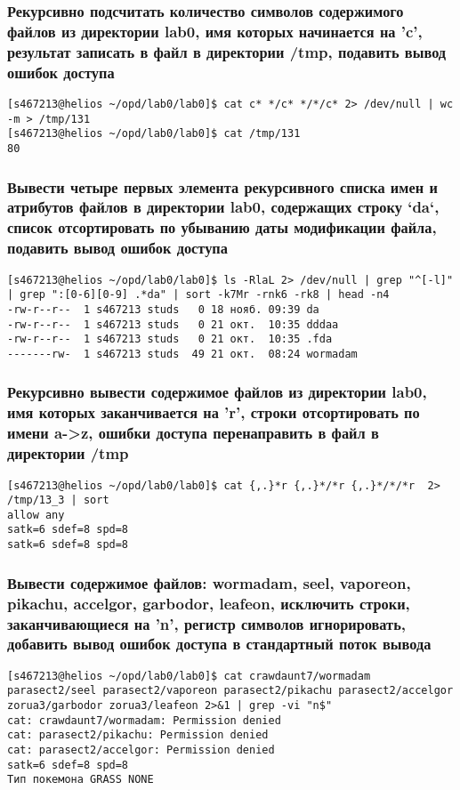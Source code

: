\subsubsection*{Рекурсивно подсчитать количество символов содержимого файлов из директории lab0, имя которых начинается на 'c', результат записать в файл в директории /tmp, подавить вывод ошибок доступа}
\begin{verbatim}
[s467213@helios ~/opd/lab0/lab0]$ cat c* */c* */*/c* 2> /dev/null | wc -m > /tmp/131
[s467213@helios ~/opd/lab0/lab0]$ cat /tmp/131
80
\end{verbatim}


\subsubsection*{Вывести четыре первых элемента рекурсивного списка имен и атрибутов файлов в директории lab0, содержащих строку `da`, список отсортировать по убыванию даты модификации файла, подавить вывод ошибок доступа}
\begin{verbatim}
[s467213@helios ~/opd/lab0/lab0]$ ls -RlaL 2> /dev/null | grep "^[-l]" | grep ":[0-6][0-9] .*da" | sort -k7Mr -rnk6 -rk8 | head -n4
-rw-r--r--  1 s467213 studs   0 18 нояб. 09:39 da
-rw-r--r--  1 s467213 studs   0 21 окт.  10:35 dddaa
-rw-r--r--  1 s467213 studs   0 21 окт.  10:35 .fda
-------rw-  1 s467213 studs  49 21 окт.  08:24 wormadam
\end{verbatim}

\subsubsection*{Рекурсивно вывести содержимое файлов из директории lab0, имя которых заканчивается на 'r', строки отсортировать по имени a->z, ошибки доступа перенаправить в файл в директории /tmp}
\begin{verbatim}
[s467213@helios ~/opd/lab0/lab0]$ cat {,.}*r {,.}*/*r {,.}*/*/*r  2> /tmp/13_3 | sort
allow any
satk=6 sdef=8 spd=8
satk=6 sdef=8 spd=8
\end{verbatim}

\subsubsection*{Вывести содержимое файлов: wormadam, seel, vaporeon, pikachu, accelgor, garbodor, leafeon, исключить строки, заканчивающиеся на 'n', регистр символов игнорировать, добавить вывод ошибок доступа в стандартный поток вывода}
\begin{verbatim}
[s467213@helios ~/opd/lab0/lab0]$ cat crawdaunt7/wormadam parasect2/seel parasect2/vaporeon parasect2/pikachu parasect2/accelgor zorua3/garbodor zorua3/leafeon 2>&1 | grep -vi "n$"
cat: crawdaunt7/wormadam: Permission denied
cat: parasect2/pikachu: Permission denied
cat: parasect2/accelgor: Permission denied
satk=6 sdef=8 spd=8
Тип покемона GRASS NONE
\end{verbatim}

